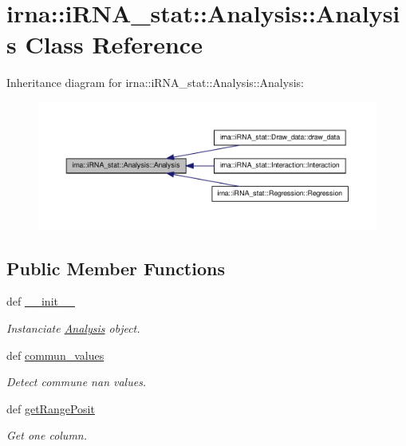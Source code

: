 \hypertarget{classirna_1_1iRNA__stat_1_1Analysis_1_1Analysis}{
\section{irna\-:\-:i\-R\-N\-A\-\_\-stat\-:\-:\-Analysis\-:\-:\-Analysis \-Class \-Reference}
\label{classirna_1_1iRNA__stat_1_1Analysis_1_1Analysis}
}


\-Inheritance diagram for irna\-:\-:i\-R\-N\-A\-\_\-stat\-:\-:\-Analysis\-:\-:\-Analysis\-:\nopagebreak
\begin{figure}[H]
\begin{center}
\leavevmode
\includegraphics[width=350pt]{classirna_1_1iRNA__stat_1_1Analysis_1_1Analysis__inherit__graph}
\end{center}
\end{figure}
\subsection*{\-Public \-Member \-Functions}
\begin{DoxyCompactItemize}
\item 
def \hyperlink{classirna_1_1iRNA__stat_1_1Analysis_1_1Analysis_a5d3f56c15a84c0c6f03574692ff0093b}{\-\_\-\-\_\-init\-\_\-\-\_\-}
\begin{DoxyCompactList}\small\item\em \-Instanciate \hyperlink{classirna_1_1iRNA__stat_1_1Analysis_1_1Analysis}{\-Analysis} object. \end{DoxyCompactList}\item 
def \hyperlink{classirna_1_1iRNA__stat_1_1Analysis_1_1Analysis_a40baa612192c5216bdcf24487299f937}{commun\-\_\-values}
\begin{DoxyCompactList}\small\item\em \-Detect commune nan values. \end{DoxyCompactList}\item 
def \hyperlink{classirna_1_1iRNA__stat_1_1Analysis_1_1Analysis_a4f286c31ca13401ba1a4965e2bb5c2dd}{get\-Range\-Posit}
\begin{DoxyCompactList}\small\item\em \-Get one column. \end{DoxyCompactList}\end{DoxyCompactItemize}


